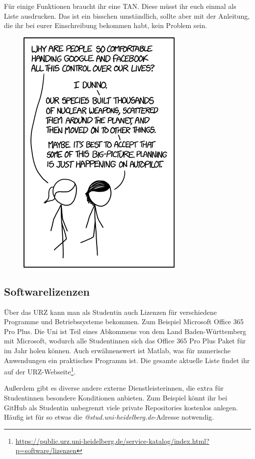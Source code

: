 Für einige Funktionen braucht ihr eine TAN. Diese müsst ihr euch einmal als Liste ausdrucken. Das ist ein bisschen umständlich, sollte aber mit der Anleitung, die ihr bei eurer Einschreibung bekommen habt, kein Problem sein.

\begin{figure}[h]
    \centering
    \includegraphics[width=.7\linewidth]{bilder/planning.png}
\end{figure}

\subsection{Softwarelizenzen}

Über das URZ kann man als Studentin auch Lizenzen für verschiedene Programme und Betriebssysteme bekommen. Zum Beispiel Microsoft Office 365 Pro Plus. Die Uni ist Teil eines Abkommens von dem Land Baden-Württemberg mit Microsoft, wodurch alle Studentinnen sich das Office 365 Pro Plus Paket für  im Jahr holen können. Auch erwähnenswert ist Matlab, was für numerische Anwendungen ein praktisches Programm ist. Die gesamte aktuelle Liste findet ihr auf der URZ-Webseite\footnote{\url{https://public.urz.uni-heidelberg.de/service-katalog/index.html?p=software/lizenzen}}.

Außerdem gibt es diverse andere externe Dienstleisterinnen, die extra für Studentinnen besondere Konditionen anbieten. Zum Beispiel könnt ihr bei GitHub als Studentin unbegrenzt viele private Repositories kostenlos anlegen. Häufig ist für so etwas die \emph{@stud.uni-heidelberg.de}-Adresse notwendig.
